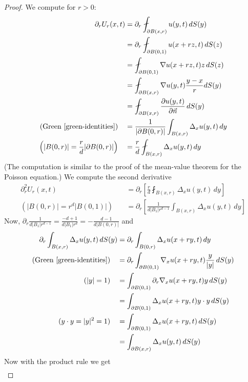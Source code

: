\documentclass{report}
\theoremstyle{tommy}
\begin{document}
  \begin{proof}
    We compute for \(r > 0\):
    \begin{align*}
      \partial_r U_r(x,t) &= \partial_r \fint_{\partial B(x,r)} u(y,t) \, dS(y) \\
      &= \partial_r \fint_{\partial B(0,1)} u(x+rz,t) \, dS(z) \\
      &= \fint_{\partial B(0,1)} \nabla u(x+rz,t) z \, dS(z) \\
      &= \fint_{\partial B(x,r)} \nabla u(y,t) \frac{y-x}{r} dS(y) \\
      &= \fint_{\partial B(x,r)} \frac{\partial u(y,t)}{\partial \vec{n}} \, dS(y) \\
      \text{(Green \ref{green-identities})}\quad &= \frac{1}{|\partial B(0,r)|} \int_{B(x,r)} \Delta_x u(y,t) \, dy \\
      \left(|B(0,r)| = \frac{r}{d} |\partial B(0,r)|\right)\quad&= \frac{r}{d} \fint_{B(x,r)} \Delta_x u(y,t) \, dy
    \end{align*}
    (The computation is similar to the proof of the mean-value theorem for the Poisson equation.) 
    We compute the second derivative
    \begin{align*}
      \partial^2_r U_r(x,t) &= \partial_r \left[\frac{r}{d} \fint_{B(x,r)} \Delta_x u(y,t) \, dy\right] \\
      \left(|B(0,r)|=r^d|B(0,1)|\right)\quad &= \partial_r \left[\frac{1}{d|B_1|r^{d-1}} \int_{B(x,r)} \Delta_x u(y,t) \, dy\right] 
    \end{align*}
    Now, \(\partial_r \frac{1}{d|B_1|r^{d-1}} =  \frac{-d+1}{d|B_1|r^d} = - \frac{d-1}{d|B(0,r)|}\) and 
    \begin{align*}
      \partial_r \int_{B(x,r)} \Delta_x u(y,t) \, dS(y) &= \partial_r \int_{B(0,r)} \Delta_x u(x+ry,t) \, dy \\
      \text{(Green \ref{green-identities})}\quad &= \partial_r \int_{\partial B(0,1)} \nabla_x u(x+ry, t)\frac{y}{|y|} \, dS(y) \\
      (|y|=1) \quad &= \int_{\partial B(0,1)} \partial_r \nabla_x u(x+ry, t)y \, dS(y) \\
      &= \int_{\partial B(0,1)} \Delta_x u(x+ry, t)y\cdot y \, dS(y) \\
      (y\cdot y = |y|^2 = 1) \quad &= \int_{\partial B(0,1)} \Delta_x u(x+ry, t) \, dS(y) \\
      &= \int_{\partial B(x,r)} \Delta_x u(y, t) \, dS(y)
    \end{align*}
    Now with the product rule we get 
    \begin{align*}

\end{align*}
\end{proof}
\end{document}
